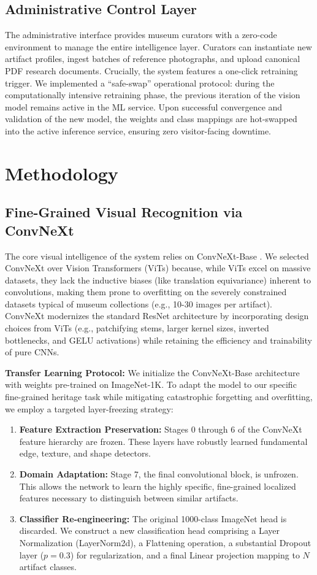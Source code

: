 \documentclass[conference]{IEEEtran}
\begin{document}
\subsection{Administrative Control Layer}
The administrative interface provides museum curators with a zero-code environment to manage the entire intelligence layer. Curators can instantiate new artifact profiles, ingest batches of reference photographs, and upload canonical PDF research documents. Crucially, the system features a one-click retraining trigger. We implemented a ``safe-swap'' operational protocol: during the computationally intensive retraining phase, the previous iteration of the vision model remains active in the ML service. Upon successful convergence and validation of the new model, the weights and class mappings are hot-swapped into the active inference service, ensuring zero visitor-facing downtime.

\section{Methodology}

\subsection{Fine-Grained Visual Recognition via ConvNeXt}
The core visual intelligence of the system relies on ConvNeXt-Base \cite{convnext}. We selected ConvNeXt over Vision Transformers (ViTs) because, while ViTs excel on massive datasets, they lack the inductive biases (like translation equivariance) inherent to convolutions, making them prone to overfitting on the severely constrained datasets typical of museum collections (e.g., 10-30 images per artifact). ConvNeXt modernizes the standard ResNet architecture by incorporating design choices from ViTs (e.g., patchifying stems, larger kernel sizes, inverted bottlenecks, and GELU activations) while retaining the efficiency and trainability of pure CNNs.

\textbf{Transfer Learning Protocol:} We initialize the ConvNeXt-Base architecture with weights pre-trained on ImageNet-1K. To adapt the model to our specific fine-grained heritage task while mitigating catastrophic forgetting and overfitting, we employ a targeted layer-freezing strategy:
\begin{enumerate}
    \item \textbf{Feature Extraction Preservation:} Stages 0 through 6 of the ConvNeXt feature hierarchy are frozen. These layers have robustly learned fundamental edge, texture, and shape detectors.
    \item \textbf{Domain Adaptation:} Stage 7, the final convolutional block, is unfrozen. This allows the network to learn the highly specific, fine-grained localized features necessary to distinguish between similar artifacts.
    \item \textbf{Classifier Re-engineering:} The original 1000-class ImageNet head is discarded. We construct a new classification head comprising a Layer Normalization (LayerNorm2d), a Flattening operation, a substantial Dropout layer ($p=0.3$) for regularization, and a final Linear projection mapping to $N$ artifact classes.
\end{enumerate}
\end{document}
